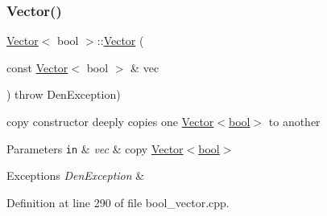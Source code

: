\subsubsection{\texorpdfstring{Vector()}{Vector()}\hspace{0.1cm}{\footnotesize\ttfamily [4/5]}}
{\footnotesize\ttfamily \hyperlink{classVector}{Vector}$<$ bool $>$\+::\hyperlink{classVector}{Vector} (\begin{DoxyParamCaption}\item[{const \hyperlink{classVector}{Vector}$<$ bool $>$ \&}]{vec }\end{DoxyParamCaption}) throw  Den\+Exception) }



copy constructor  deeply copies one \hyperlink{classVector_3_01bool_01_4}{Vector$<$bool$>$} to another 


\begin{DoxyParams}[1]{Parameters}
\mbox{\tt in}  & {\em vec} & copy \hyperlink{classVector_3_01bool_01_4}{Vector$<$bool$>$} \\
\hline
\end{DoxyParams}

\begin{DoxyExceptions}{Exceptions}
{\em Den\+Exception} & \\
\hline
\end{DoxyExceptions}


Definition at line 290 of file bool\+\_\+vector.\+cpp.


